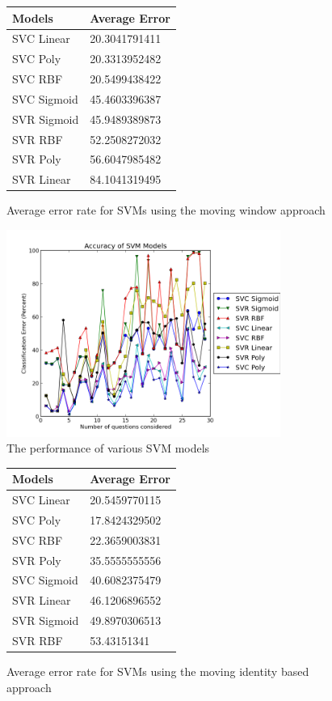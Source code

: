 \begin{figure}[h!]
\centering
\begin{tabular}{l || l }
Models & Average Error \\ \hline \hline
SVC Linear & 20.3041791411 \\ \hline
SVC Poly & 20.3313952482 \\ \hline
SVC RBF & 20.5499438422 \\ \hline
SVC Sigmoid & 45.4603396387 \\ \hline
SVR Sigmoid & 45.9489389873 \\ \hline
SVR RBF & 52.2508272032 \\ \hline
SVR Poly & 56.6047985482 \\ \hline
SVR Linear & 84.1041319495 \\ \hline

\end{tabular}
\caption{Average error rate for SVMs using the moving window approach}
\label{table:svmsmovingwindowaverages}
\end{figure}


\begin{figure}[h!]
\centering
\includegraphics[width=0.8\textwidth]{images/svmsidentified.png}
\caption{The performance of various SVM models}
\label{fig:svmsidentified}
\end{figure}

\begin{figure}[h!]
\centering
\begin{tabular}{l || l }
Models & Average Error \\ \hline \hline
SVC Linear & 20.5459770115 \\ \hline
SVC Poly & 17.8424329502 \\ \hline
SVC RBF & 22.3659003831 \\ \hline
SVR Poly & 35.5555555556 \\ \hline
SVC Sigmoid & 40.6082375479 \\ \hline
SVR Linear & 46.1206896552 \\ \hline
SVR Sigmoid & 49.8970306513 \\ \hline
SVR RBF & 53.43151341 \\ \hline

\end{tabular}
\caption{Average error rate for SVMs using the moving identity based approach}
\label{table:svmsidentityaverages}
\end{figure}

